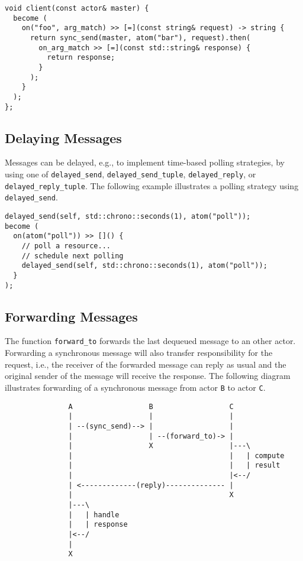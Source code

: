 \begin{lstlisting}
void client(const actor& master) {
  become (
    on("foo", arg_match) >> [=](const string& request) -> string {
      return sync_send(master, atom("bar"), request).then(
        on_arg_match >> [=](const std::string& response) {
          return response;
        }
      );
    }
  );
};
\end{lstlisting}

\subsection{Delaying Messages}

Messages can be delayed, e.g., to implement time-based polling strategies, by using one of \lstinline^delayed_send^, \lstinline^delayed_send_tuple^, \lstinline^delayed_reply^, or \lstinline^delayed_reply_tuple^.
The following example illustrates a polling strategy using \lstinline^delayed_send^.

\begin{lstlisting}
delayed_send(self, std::chrono::seconds(1), atom("poll"));
become (
  on(atom("poll")) >> []() {
    // poll a resource...
    // schedule next polling
    delayed_send(self, std::chrono::seconds(1), atom("poll"));
  }
);
\end{lstlisting}

\clearpage
\subsection{Forwarding Messages}

The function \lstinline^forward_to^ forwards the last dequeued message to an other actor.
Forwarding a synchronous message will also transfer responsibility for the request, i.e., the receiver of the forwarded message can reply as usual and the original sender of the message will receive the response.
The following diagram illustrates forwarding of a synchronous message from actor \texttt{B} to actor \texttt{C}.

\begin{footnotesize}
\begin{verbatim}
               A                  B                  C
               |                  |                  |
               | --(sync_send)--> |                  |
               |                  | --(forward_to)-> |
               |                  X                  |---\
               |                                     |   | compute
               |                                     |   | result
               |                                     |<--/
               | <-------------(reply)-------------- |
               |                                     X
               |---\
               |   | handle
               |   | response
               |<--/
               |
               X
\end{verbatim}
\end{footnotesize}

